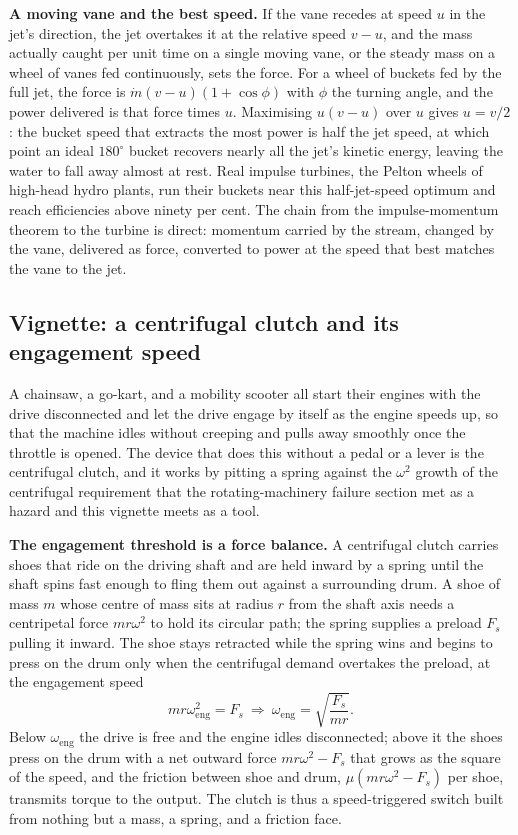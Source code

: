 \textbf{A moving vane and the best speed.} If the vane recedes at speed
$u$ in the jet's direction, the jet overtakes it at the relative speed
$v-u$, and the mass actually caught per unit time on a single moving
vane, or the steady mass on a wheel of vanes fed continuously, sets the
force. For a wheel of buckets fed by the full jet, the force is
$\dot{m}(v-u)(1+\cos\phi)$ with $\phi$ the turning angle, and the power
delivered is that force times $u$. Maximising $u(v-u)$ over $u$ gives
$u=v/2$: the bucket speed that extracts the most power is half the jet
speed, at which point an ideal $180^{\circ}$ bucket recovers nearly all
the jet's kinetic energy, leaving the water to fall away almost at rest.
Real impulse turbines, the Pelton wheels of high-head hydro plants, run
their buckets near this half-jet-speed optimum and reach efficiencies
above ninety per cent. The chain from the impulse-momentum theorem to
the turbine is direct: momentum carried by the stream, changed by the
vane, delivered as force, converted to power at the speed that best
matches the vane to the jet.



\subsection{Vignette: a centrifugal clutch and its engagement speed}

 A chainsaw, a go-kart, and a mobility scooter all
start their engines with the drive disconnected and let the drive engage
by itself as the engine speeds up, so that the machine idles without
creeping and pulls away smoothly once the throttle is opened. The device
that does this without a pedal or a lever is the centrifugal clutch, and
it works by pitting a spring against the $\omega^{2}$ growth of the
centrifugal requirement that the rotating-machinery failure section met
as a hazard and this vignette meets as a tool.

\textbf{The engagement threshold is a force balance.} A centrifugal
clutch carries shoes that ride on the driving shaft and are held inward
by a spring until the shaft spins fast enough to fling them out against a
surrounding drum. A shoe of mass $m$ whose centre of mass sits at radius
$r$ from the shaft axis needs a centripetal force $m r\omega^{2}$ to hold
its circular path; the spring supplies a preload $F_{s}$ pulling it
inward. The shoe stays retracted while the spring wins and begins to
press on the drum only when the centrifugal demand overtakes the
preload, at the engagement speed
\[
m r\omega_{\text{eng}}^{2}=F_{s} \ \Rightarrow\ \omega_{\text{eng}}=
\sqrt{\frac{F_{s}}{m r}}.
\]
Below $\omega_{\text{eng}}$ the drive is free and the engine idles
disconnected; above it the shoes press on the drum with a net outward
force $m r\omega^{2}-F_{s}$ that grows as the square of the speed, and
the friction between shoe and drum, $\mu(m r\omega^{2}-F_{s})$ per shoe,
transmits torque to the output. The clutch is thus a speed-triggered
switch built from nothing but a mass, a spring, and a friction face.

